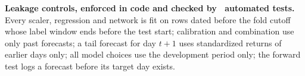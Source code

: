 \documentclass[10pt]{article}
\begin{document}
\vspace{1mm}
{\small\noindent\textbf{Leakage controls, enforced in code and checked by \NTests\ automated tests.} Every scaler, regression
and network is fit on rows dated before the fold cutoff whose label window ends before the test start; calibration and
combination use only past forecasts; a tail forecast for day $t{+}1$ uses standardized returns of earlier days only;
all model choices use the development period only; the forward test logs a forecast before its target day exists.}
\end{document}
